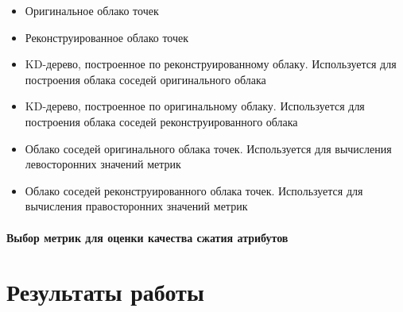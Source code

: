 \begin{itemize}
    \item Оригинальное облако точек
    \item Реконструированное облако точек
    \item KD-дерево, построенное по реконструированному облаку. Используется для
    построения облака соседей оригинального облака
    \item KD-дерево, построенное по оригинальному облаку. Используется для
    построения облака соседей реконструированного облака
    \item Облако соседей оригинального облака точек. Используется для вычисления
    левосторонних значений метрик
    \item Облако соседей реконструированного облака точек. Используется для
    вычисления правосторонних значений метрик
\end{itemize}


\subsubsection{Выбор метрик для оценки качества сжатия атрибутов}


\chapter{Результаты работы}





